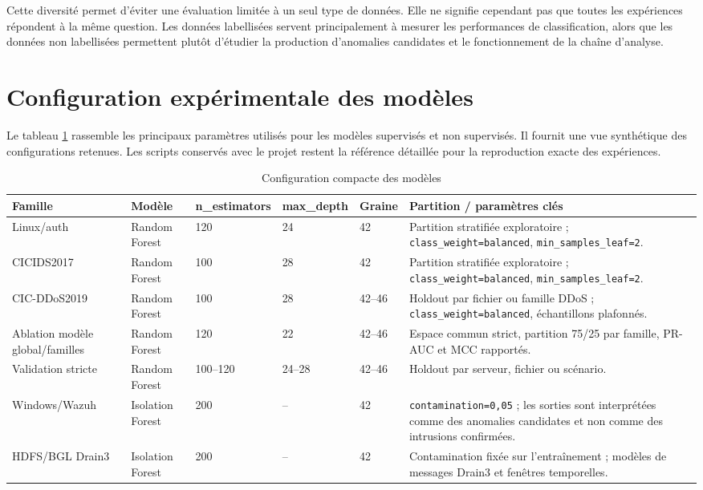 Cette diversité permet d'éviter une évaluation limitée à un seul type de données. Elle ne signifie cependant pas que toutes les expériences répondent à la même question. Les données labellisées servent principalement à mesurer les performances de classification, alors que les données non labellisées permettent plutôt d'étudier la production d'anomalies candidates et le fonctionnement de la chaîne d'analyse.

\section{Configuration expérimentale des modèles}

Le tableau \ref{tab:model-config} rassemble les principaux paramètres utilisés pour les modèles supervisés et non supervisés. Il fournit une vue synthétique des configurations retenues. Les scripts conservés avec le projet restent la référence détaillée pour la reproduction exacte des expériences.

\begin{table}[H]
\centering
\caption{Configuration compacte des modèles}
\label{tab:model-config}
\scriptsize

\begin{tabularx}{\textwidth}{p{2.2cm}p{2.1cm}p{1.5cm}p{1.5cm}p{1.4cm}X}
\toprule
\textbf{Famille} &
\textbf{Modèle} &
\textbf{n\_estimators} &
\textbf{max\_depth} &
\textbf{Graine} &
\textbf{Partition / paramètres clés}
\tabularnewline
\midrule

Linux/auth &
Random Forest &
120 &
24 &
42 &
Partition stratifiée exploratoire ; \texttt{class\_weight=balanced}, \texttt{min\_samples\_leaf=2}.
\tabularnewline

CICIDS2017 &
Random Forest &
100 &
28 &
42 &
Partition stratifiée exploratoire ; \texttt{class\_weight=balanced}, \texttt{min\_samples\_leaf=2}.
\tabularnewline

CIC-DDoS2019 &
Random Forest &
100 &
28 &
42--46 &
Holdout par fichier ou famille DDoS ; \texttt{class\_weight=balanced}, échantillons plafonnés.
\tabularnewline

Ablation modèle global/familles &
Random Forest &
120 &
22 &
42--46 &
Espace commun strict, partition 75/25 par famille, PR-AUC et MCC rapportés.
\tabularnewline

Validation stricte &
Random Forest &
100--120 &
24--28 &
42--46 &
Holdout par serveur, fichier ou scénario.
\tabularnewline

Windows/Wazuh &
Isolation Forest &
200 &
-- &
42 &
\texttt{contamination=0,05} ; les sorties sont interprétées comme des anomalies candidates et non comme des intrusions confirmées.
\tabularnewline

HDFS/BGL Drain3 &
Isolation Forest &
200 &
-- &
42 &
Contamination fixée sur l'entraînement ; modèles de messages Drain3 et fenêtres temporelles.
\tabularnewline

\bottomrule
\end{tabularx}
\end{table}

